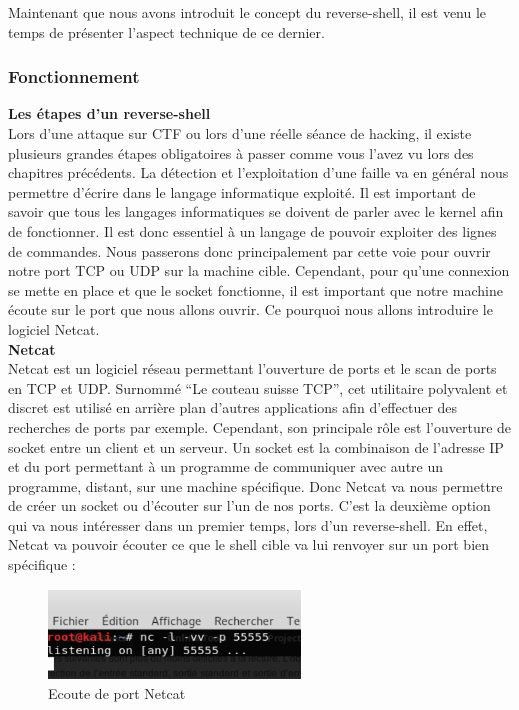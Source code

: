 Maintenant que nous avons introduit le concept du reverse-shell, il est venu le temps de présenter l’aspect technique de ce dernier.

\subsubsection{Fonctionnement}

 \textbf{Les étapes d'un reverse-shell}\\

Lors d’une attaque sur CTF ou lors d’une réelle séance de hacking, il existe plusieurs grandes étapes obligatoires à passer comme vous l’avez vu lors des chapitres précédents. La détection et l’exploitation d’une faille va en général nous permettre d’écrire dans le langage informatique exploité. Il est important de savoir que tous les langages informatiques se doivent de parler avec le kernel afin de fonctionner. Il est donc essentiel à un langage de pouvoir exploiter des lignes de commandes. Nous passerons donc principalement par cette voie pour ouvrir notre port TCP ou UDP sur la machine cible. Cependant, pour qu’une connexion se mette en place et que le socket fonctionne, il est important que notre machine écoute sur le port que nous allons ouvrir. Ce pourquoi nous allons introduire le logiciel Netcat.\\

 \textbf{Netcat}\\

Netcat est un logiciel réseau permettant l’ouverture de ports et le scan de ports en TCP et UDP. Surnommé “Le couteau suisse TCP”,  cet utilitaire polyvalent et discret est utilisé en arrière plan d’autres applications afin d’effectuer des recherches de ports par exemple. Cependant, son  principale rôle est l’ouverture de socket entre un client et un serveur.
Un socket est la combinaison de l’adresse IP et du port permettant à un programme de communiquer avec autre un programme, distant, sur une machine spécifique. 
Donc Netcat va nous permettre de créer un socket ou d’écouter sur l’un de nos ports. C’est la deuxième option qui va nous intéresser dans un premier temps, lors d’un reverse-shell. En effet, Netcat va pouvoir écouter ce que le shell cible va lui renvoyer sur un port bien spécifique :

\begin{figure}[htp!]
  \centering
  \setlength\figureheight{7cm}
  \setlength\figurewidth{9cm}
  \includegraphics[width=0.6\textwidth]{oui/Ancien/imangeancien/Reverse-Shell/netcat_lvp.PNG}
  \caption{Ecoute de port Netcat}
  \label{fig:courbe-tikz}
\end{figure}

